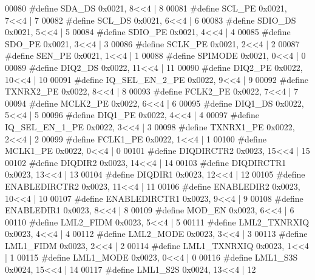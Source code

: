 \begin{DoxyCode}
00080 \textcolor{preprocessor}{#define SDA\_DS 0x0021, 8<<4 |  8}
00081 \textcolor{preprocessor}{#define SCL\_PE 0x0021, 7<<4 |  7}
00082 \textcolor{preprocessor}{#define SCL\_DS 0x0021, 6<<4 |  6}
00083 \textcolor{preprocessor}{#define SDIO\_DS 0x0021, 5<<4 |  5}
00084 \textcolor{preprocessor}{#define SDIO\_PE 0x0021, 4<<4 |  4}
00085 \textcolor{preprocessor}{#define SDO\_PE 0x0021, 3<<4 |  3}
00086 \textcolor{preprocessor}{#define SCLK\_PE 0x0021, 2<<4 |  2}
00087 \textcolor{preprocessor}{#define SEN\_PE 0x0021, 1<<4 |  1}
00088 \textcolor{preprocessor}{#define SPIMODE 0x0021, 0<<4 |  0}
00089 \textcolor{preprocessor}{#define DIQ2\_DS 0x0022, 11<<4 |  11}
00090 \textcolor{preprocessor}{#define DIQ2\_PE 0x0022, 10<<4 |  10}
00091 \textcolor{preprocessor}{#define IQ\_SEL\_EN\_2\_PE 0x0022, 9<<4 |  9}
00092 \textcolor{preprocessor}{#define TXNRX2\_PE 0x0022, 8<<4 |  8}
00093 \textcolor{preprocessor}{#define FCLK2\_PE 0x0022, 7<<4 |  7}
00094 \textcolor{preprocessor}{#define MCLK2\_PE 0x0022, 6<<4 |  6}
00095 \textcolor{preprocessor}{#define DIQ1\_DS 0x0022, 5<<4 |  5}
00096 \textcolor{preprocessor}{#define DIQ1\_PE 0x0022, 4<<4 |  4}
00097 \textcolor{preprocessor}{#define IQ\_SEL\_EN\_1\_PE 0x0022, 3<<4 |  3}
00098 \textcolor{preprocessor}{#define TXNRX1\_PE 0x0022, 2<<4 |  2}
00099 \textcolor{preprocessor}{#define FCLK1\_PE 0x0022, 1<<4 |  1}
00100 \textcolor{preprocessor}{#define MCLK1\_PE 0x0022, 0<<4 |  0}
00101 \textcolor{preprocessor}{#define DIQDIRCTR2 0x0023, 15<<4 |  15}
00102 \textcolor{preprocessor}{#define DIQDIR2 0x0023, 14<<4 |  14}
00103 \textcolor{preprocessor}{#define DIQDIRCTR1 0x0023, 13<<4 |  13}
00104 \textcolor{preprocessor}{#define DIQDIR1 0x0023, 12<<4 |  12}
00105 \textcolor{preprocessor}{#define ENABLEDIRCTR2 0x0023, 11<<4 |  11}
00106 \textcolor{preprocessor}{#define ENABLEDIR2 0x0023, 10<<4 |  10}
00107 \textcolor{preprocessor}{#define ENABLEDIRCTR1 0x0023, 9<<4 |  9}
00108 \textcolor{preprocessor}{#define ENABLEDIR1 0x0023, 8<<4 |  8}
00109 \textcolor{preprocessor}{#define MOD\_EN 0x0023, 6<<4 |  6}
00110 \textcolor{preprocessor}{#define LML2\_FIDM 0x0023, 5<<4 |  5}
00111 \textcolor{preprocessor}{#define LML2\_TXNRXIQ 0x0023, 4<<4 |  4}
00112 \textcolor{preprocessor}{#define LML2\_MODE 0x0023, 3<<4 |  3}
00113 \textcolor{preprocessor}{#define LML1\_FIDM 0x0023, 2<<4 |  2}
00114 \textcolor{preprocessor}{#define LML1\_TXNRXIQ 0x0023, 1<<4 |  1}
00115 \textcolor{preprocessor}{#define LML1\_MODE 0x0023, 0<<4 |  0}
00116 \textcolor{preprocessor}{#define LML1\_S3S 0x0024, 15<<4 |  14}
00117 \textcolor{preprocessor}{#define LML1\_S2S 0x0024, 13<<4 |  12}

\end{DoxyCode}

